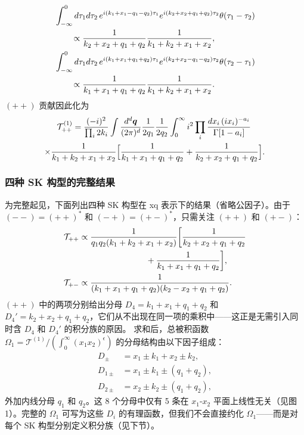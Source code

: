 ﻿\documentclass[a4paper,11pt]{article}
\begin{document}
\begin{align}
    &\int_{-\infty}^0 d\tau_1d\tau_2\,e^{i(k_1+x_1-q_1-q_2)\tau_1}
      e^{i(k_2+x_2+q_1+q_2)\tau_2}\theta(\tau_1-\tau_2)\notag\\
    &\qquad\propto\frac{1}{k_2+x_2+q_1+q_2}\frac{1}{k_1+k_2+x_1+x_2},\\
    &\int_{-\infty}^0 d\tau_1d\tau_2\,e^{i(k_1+x_1+q_1+q_2)\tau_1}
      e^{i(k_2+x_2-q_1-q_2)\tau_2}\theta(\tau_2-\tau_1)\notag\\
    &\qquad\propto\frac{1}{k_1+x_1+q_1+q_2}\frac{1}{k_1+k_2+x_1+x_2}.
\end{align}
$(++)$ 贡献因此化为
\begin{multline}
    \mathcal{T}^{(1)}_{++}=\frac{(-i)^2}{\prod_i 2k_i}\int\frac{d^d\boldsymbol{q}}{(2\pi)^d}\frac{1}{2q_1}\frac{1}{2q_2}
    \int_0^\infty i^2\prod_i\frac{dx_i\,(ix_i)^{-a_i}}{\Gamma[1-a_i]}\,\\
    \times\frac{1}{k_1+k_2+x_1+x_2}\Bigl[\frac{1}{k_1+x_1+q_1+q_2}+\frac{1}{k_2+x_2+q_1+q_2}\Bigr].
\end{multline}

\subsubsection{四种 SK 构型的完整结果}

为完整起见，下面列出四种 SK 构型在 xq 表示下的结果（省略公因子）。由于 $(--)= (++)^*$ 和 $(-+)=(+-)^*$，只需关注 $(++)$ 和 $(+-)$：
\begin{align}
    \mathcal{T}_{++}&\propto 
    \frac{1}{q_1q_2(k_1+k_2+x_1+x_2)}
    \biggl[
    \frac{1}{k_2+x_2+q_1+q_2}\notag\\
    &\qquad\qquad\qquad\qquad
    +\frac{1}{k_1+x_1+q_1+q_2}
    \biggr],\\
    \mathcal{T}_{+-}&\propto
    \frac{1}{(k_1+x_1+q_1+q_2)
    (k_2-x_2+q_1+q_2)}.
\end{align}
$(++)$ 中的两项分别给出分母 $D_4=k_1+x_1+q_1+q_2$ 和 $D_4'=k_2+x_2+q_1+q_2$，它们从不出现在同一项的乘积中——这正是无需引入同时含 $D_4$ 和 $D_4'$ 的积分族的原因。
求和后，总被积函数 $\Omega_1=\mathcal{T}^{(1)}/(\int_0^\infty (x_1x_2)^\epsilon)$ 的分母结构由以下因子组成：
\begin{align}
    D_\pm &= x_1\pm k_1 + x_2\pm k_2,\\
    D_{1\pm} &= x_1\pm k_1 \pm (q_1+q_2),\\
    D_{2\pm} &= x_2\pm k_2 \pm (q_1+q_2),
\end{align}
外加内线分母 $q_1$ 和 $q_2$。这 8 个分母中仅有 5 条在 $x_1$-$x_2$ 平面上线性无关（见图 1）。完整的 $\Omega_1$ 可写为这些 $D_i$ 的有理函数，但我们不会直接约化 $\Omega_1$——而是对每个 SK 构型分别定义积分族（见下节）。
\end{document}
